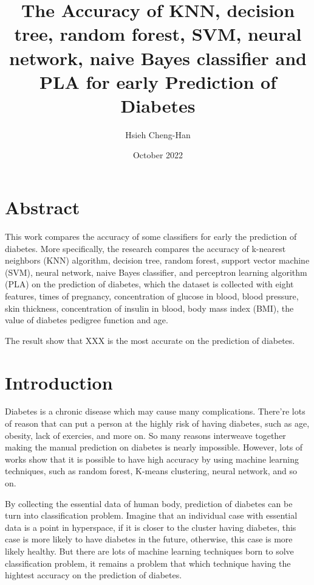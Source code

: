 \documentclass[twocolumn,10pt]{article}
\begin{document}
\title{The Accuracy of KNN, decision tree, random forest, SVM, neural network, naive Bayes classifier and PLA for early Prediction of Diabetes}

\author{Hsieh Cheng-Han}
\date{October 2022}
\maketitle

\section*{Abstract}
  This work compares the accuracy of some classifiers for early the prediction of diabetes. More specifically, 
  the research compares the accuracy of k-nearest neighbors (KNN) algorithm, decision tree, random forest, 
  support vector machine (SVM), neural network, naive Bayes classifier, and perceptron learning algorithm (PLA) on the prediction of diabetes, which 
  the dataset is collected with eight features, times of pregnancy, concentration of glucose in blood, blood 
  pressure, skin thickness,  concentration of insulin in blood, body mass index (BMI), the value of diabetes 
  pedigree function and age.

  The result show that XXX is the most accurate on the prediction of diabetes.

\section{Introduction}
\label{sec:Introduction}
  Diabetes is a chronic disease which may cause many complications. There're lots of reason that can put a person 
  at the highly risk of having diabetes, such as age, obesity, lack of exercies, and more on. So many reasons 
  interweave together making the manual prediction on diabetes is nearly impossible. However, lots of works \cite{MUJUMDAR2019292} \cite{MAHBOOBALAM2019100204} \cite{10.3389/fgene.2018.00515}
  show that it is possible to have high accuracy by using machine learning techniques, such as random forest, 
  K-means clustering, neural network, and so on. 

  By collecting the essential data of human body, prediction of diabetes can be turn into classification problem. 
  Imagine that an individual case with essential data is a point in hyperspace, if it is closer to the cluster
  having diabetes, this case is more likely to have diabetes in the future, otherwise, this case is more likely 
  healthy. But there are lots of machine learning techniques born to solve classification problem, it remains a 
  problem that which technique having the hightest accuracy on the prediction of diabetes. 
\end{document}
